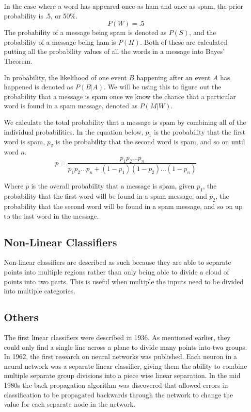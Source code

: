 \documentclass[12pt]{article}
\begin{document}
In the case where a word has appeared once as ham and once as spam, the prior probability is .5, or 50\%.
$$P(W) = .5$$
The probability of a message being spam is denoted as $P(S)$, and the probability of a message being ham is
$P(H)$. Both of these are calculated putting all the probability values of all the words in a message into
Bayes' Theorem.

In probability, the likelihood of one event $B$ happening after an event $A$ has happened is denoted as
$P(B|A)$. We will be using this to figure out the probability that a message is spam once we know the chance
that a particular word is found in a spam message, denoted as $P(M|W)$.

We calculate the total probability that a message is spam by combining all of the individual probabilities.
In the equation below, $p_{1}$ is the probability that the first word is spam, $p_{2}$ is the probability that
the second word is spam, and so on until word $n$.
$$p=\dfrac{p_{1}p_{2} ... p_{n}}{p_{1}p_{2} ... p_{n} + (1-p_{1})(1-p_{2}) ... (1-p_{n})}$$

Where $p$ is the overall probability that a message is spam, given $p_{1}$, the probability that the first
word will be found in a spam message, and $p_{2}$, the probability that the second word will be found in a
spam message, and so on up to the last word in the message.


\subsection{Non-Linear Classifiers}
Non-linear classifiers are described as such because they are able to separate points into multiple regions
rather than only being able to divide a cloud of points into two parts. This is useful when multiple the
inputs need to be divided into multiple categories.
\subsection{Others}
The first linear classifiers were described in 1936. \citep{fisher1936use} As mentioned earlier, they could
only find a single line across a plane to divide many points into two groups.  In 1962, the first research on
neural networks was published. Each neuron in a neural network was a separate linear classifier, giving them
the ability to combine multiple separate group divisions into a piece wise linear separation. In the mid 1980s
the back propagation algorithm was discovered that allowed errors in classification to be propagated backwards
through the network to change the value for each separate node in the network. \citep{cortes1995support}
\end{document}
